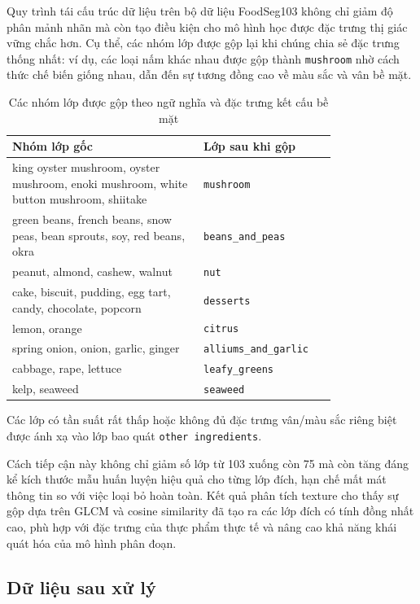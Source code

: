 Quy trình tái cấu trúc dữ liệu trên bộ dữ liệu FoodSeg103 không chỉ giảm độ phân mảnh nhãn mà còn tạo điều kiện cho mô hình học được đặc trưng thị giác vững chắc hơn. Cụ thể, các nhóm lớp được gộp lại khi chúng chia sẻ đặc trưng thống nhất: ví dụ, các loại nấm khác nhau được gộp thành \texttt{mushroom} nhờ cách thức chế biến giống nhau, dẫn đến sự tương đồng cao về màu sắc và vân bề mặt.

\begin{table}[H]
\centering
\caption{Các nhóm lớp được gộp theo ngữ nghĩa và đặc trưng kết cấu bề mặt}
\label{tab:merge_groups}
\begin{tabular}{p{0.5\linewidth}p{0.29\linewidth}}
\toprule
\textbf{Nhóm lớp gốc} & \textbf{Lớp sau khi gộp} \\
\midrule
king oyster mushroom, oyster mushroom, enoki mushroom, white button mushroom, shiitake 
& \texttt{mushroom} \\
\midrule
green beans, french beans, snow peas, bean sprouts, soy, red beans, okra 
& \texttt{beans\_and\_peas} \\
\midrule
peanut, almond, cashew, walnut 
& \texttt{nut} \\
\midrule
cake, biscuit, pudding, egg tart, candy, chocolate, popcorn 
& \texttt{desserts} \\
\midrule
lemon, orange 
& \texttt{citrus} \\
\midrule
spring onion, onion, garlic, ginger 
& \texttt{alliums\_and\_garlic} \\
\midrule
cabbage, rape, lettuce 
& \texttt{leafy\_greens} \\
\midrule
kelp, seaweed
& \texttt{seaweed} \\
\bottomrule
\end{tabular}
\end{table}

Các lớp có tần suất rất thấp hoặc không đủ đặc trưng vân/màu sắc riêng biệt được ánh xạ vào lớp bao quát \texttt{other ingredients}. 

Cách tiếp cận này không chỉ giảm số lớp từ 103 xuống còn 75 mà còn tăng đáng kể kích thước mẫu huấn luyện hiệu quả cho từng lớp đích, hạn chế mất mát thông tin so với việc loại bỏ hoàn toàn. Kết quả phân tích texture cho thấy sự gộp dựa trên GLCM và cosine similarity đã tạo ra các lớp đích có tính đồng nhất cao, phù hợp với đặc trưng của thực phẩm thực tế và nâng cao khả năng khái quát hóa của mô hình phân đoạn.
\subsection{Dữ liệu sau xử lý}


